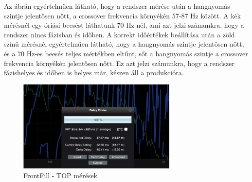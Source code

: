 Az ábrán egyértelműen látható, hogy a rendszer mérése után a hangnyomás szintje jelentősen nőtt, a crossover frekvencia környékén
57-87 Hz között. A kék mérésnél egy óriási beesést láthatunk 70 Hz-nél, ami azt jelzi számunkra, hogy a rendszer nincs fázisban és időben.
A korrekt időértékek beállítása után a zöld színű mérésnél egyértelműen látható, hogy a hangnyomás szintje jelentősen nőtt, és a 70 Hz-es
beesés teljes mértékben eltűnt, sőt a hangnyomás szintje a crossover frekvencia környékén jelentősen nőtt. Ez azt jelzi számunkra, hogy a rendszer
fázishelyes és időben is helyes már, készen áll a produkcióra.

\begin{figure}[H]
	\centering
	\includegraphics[width=300px, keepaspectratio]{figures/nearfill_smaart.jpg}
	\caption{FrontFill - TOP mérések}\label{fig:nearfill_smaart}
\end{figure}







